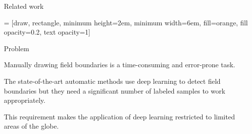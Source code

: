 \documentclass[xcolor=table]{beamer}
\begin{document}
\begin{frame}{Related work}

\centering
	
 = [draw, rectangle, 
    minimum height=2em, minimum width=6em, fill=orange, fill opacity=0.2, text opacity=1]

	
		
\end{frame}

\begin{frame}{Problem}
	
	\begin{tcolorbox}[colback=red!5,colframe=red!75!black]
		Manually drawing field boundaries is a time-consuming and error-prone task.
	\end{tcolorbox}
	
	\begin{tcolorbox}[colback=red!5,colframe=red!75!black]
		The state-of-the-art automatic methods use deep learning to detect field boundaries but they need a significant number of labeled samples to work appropriately.
	\end{tcolorbox}
	
	\begin{tcolorbox}[colback=red!5,colframe=red!75!black]
		This requirement makes the application of deep learning restricted to limited areas of the globe. 
	\end{tcolorbox}
		
\end{frame}
\end{document}
